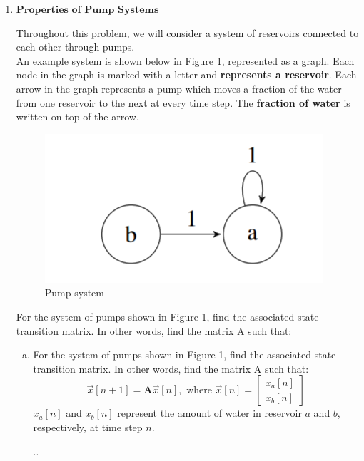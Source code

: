 \documentclass[11pt]{article}
\def\A{\textbf{A}} %
\begin{document}
\begin{enumerate}
	      \newpage
	\item $\textbf{Properties of Pump Systems}$
	
	      Throughout this problem, we will consider a system of reservoirs connected to each other through pumps.\\An example system is shown below in Figure 1, represented as a graph. Each node in the graph is marked with a letter and \textbf{represents a reservoir}. Each arrow in the graph represents a pump which moves a fraction of the water from one reservoir to the next at every time step. The \textbf{fraction of water} is written on top of the arrow.
	      \begin{figure}[h]
	      	\centering
	      	\includegraphics[scale=0.9]{q4a}
	      	\caption{ Pump system}
	      \end{figure}
	              
	      For the system of pumps shown in Figure 1, find the associated state transition matrix. In other words, find the matrix A such that:
	      \begin{enumerate}[(a)]
	      	\item For the system of pumps shown in Figure 1, find the associated state transition matrix. In other words, find the matrix A such that:
	      	      \[
	      	      	\vec{x}[n+1] = \A\vec{x}[n],\text{ where }\vec x[n] = \begin{bmatrix}
	      	      	x_a[n] \\
	      	      	x_b[n]
	      	      	\end{bmatrix}
	      	      \]
	      	      $x_a[n]$ and $x_b[n]$ represent the amount of water in reservoir $a$ and $b$, respectively, at time step $n$.
	      	      \begin{Answer}
	      	      	..
	      	      \end{Answer}
	      	                  
	      	      \newpage
	      	                  

\end{enumerate}
\end{enumerate}
\end{document}
